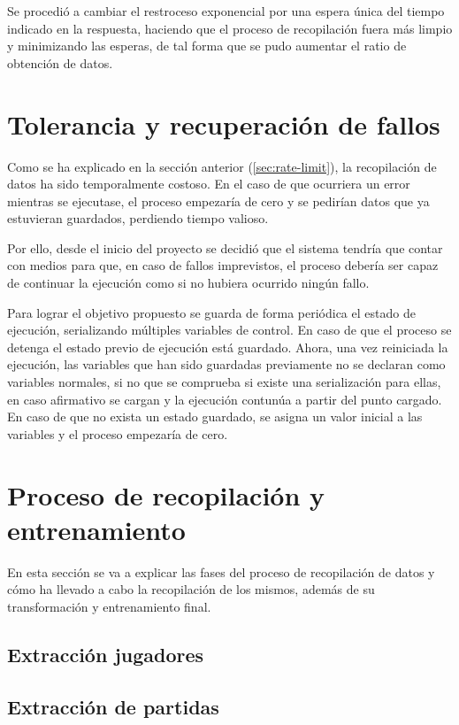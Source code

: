 Se procedió a cambiar el restroceso exponencial por una espera única del tiempo indicado en la respuesta, haciendo que el proceso de recopilación fuera más limpio y minimizando las esperas, de tal forma que se pudo aumentar el ratio de obtención de datos.

\section{Tolerancia y recuperación de fallos}\label{sec:fault-tolerance}
Como se ha explicado en la sección anterior (\ref{sec:rate-limit}), la recopilación de datos ha sido temporalmente costoso. En el caso de que ocurriera un error mientras se ejecutase, el proceso empezaría de cero y se pedirían datos que ya estuvieran guardados, perdiendo tiempo valioso.

Por ello, desde el inicio del proyecto se decidió que el sistema tendría que contar con medios para que, en caso de fallos imprevistos, el proceso debería ser capaz de continuar la ejecución como si no hubiera ocurrido ningún fallo.

Para lograr el objetivo propuesto se guarda de forma periódica el estado de ejecución, serializando múltiples variables de control. En caso de que el proceso se detenga el estado previo de ejecución está guardado. Ahora, una vez reiniciada la ejecución, las variables que han sido guardadas previamente no se declaran como variables normales, si no que se comprueba si existe una serialización para ellas, en caso afirmativo se cargan y la ejecución contunúa a partir del punto cargado. En caso de que no exista un estado guardado, se asigna un valor inicial a las variables y el proceso empezaría de cero.

\section{Proceso de recopilación y entrenamiento}
En esta sección se va a explicar las fases del proceso de recopilación de datos y cómo ha llevado a cabo la recopilación de los mismos, además de su transformación y entrenamiento final.

\subsection{Extracción jugadores}
\subsection{Extracción de partidas}
